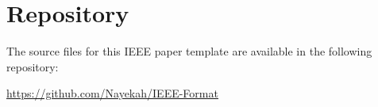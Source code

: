 \section*{Repository}

The source files for this IEEE paper template are available in the following repository:

\begin{center}
\underline{\url{https://github.com/Nayekah/IEEE-Format}}
\end{center}
